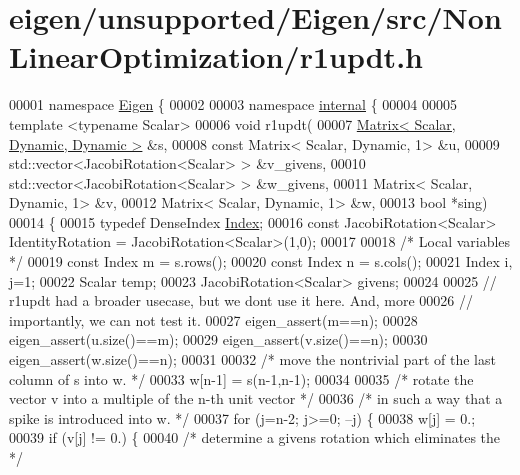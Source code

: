 \hypertarget{eigen_2unsupported_2_eigen_2src_2_non_linear_optimization_2r1updt_8h_source}{}\section{eigen/unsupported/\+Eigen/src/\+Non\+Linear\+Optimization/r1updt.h}
\label{eigen_2unsupported_2_eigen_2src_2_non_linear_optimization_2r1updt_8h_source}

\begin{DoxyCode}
00001 \textcolor{keyword}{namespace }\hyperlink{namespace_eigen}{Eigen} \{ 
00002 
00003 \textcolor{keyword}{namespace }\hyperlink{namespaceinternal}{internal} \{
00004 
00005 \textcolor{keyword}{template} <\textcolor{keyword}{typename} Scalar>
00006 \textcolor{keywordtype}{void} r1updt(
00007         \hyperlink{group___core___module}{Matrix< Scalar, Dynamic, Dynamic >} &s,
00008         \textcolor{keyword}{const} Matrix< Scalar, Dynamic, 1> &u,
00009         std::vector<JacobiRotation<Scalar> > &v\_givens,
00010         std::vector<JacobiRotation<Scalar> > &w\_givens,
00011         Matrix< Scalar, Dynamic, 1> &v,
00012         Matrix< Scalar, Dynamic, 1> &w,
00013         \textcolor{keywordtype}{bool} *sing)
00014 \{
00015     \textcolor{keyword}{typedef} DenseIndex \hyperlink{namespace_eigen_a62e77e0933482dafde8fe197d9a2cfde}{Index};
00016     \textcolor{keyword}{const} JacobiRotation<Scalar> IdentityRotation = JacobiRotation<Scalar>(1,0);
00017 
00018     \textcolor{comment}{/* Local variables */}
00019     \textcolor{keyword}{const} Index m = s.rows();
00020     \textcolor{keyword}{const} Index n = s.cols();
00021     Index i, j=1;
00022     Scalar temp;
00023     JacobiRotation<Scalar> givens;
00024 
00025     \textcolor{comment}{// r1updt had a broader usecase, but we dont use it here. And, more}
00026     \textcolor{comment}{// importantly, we can not test it.}
00027     eigen\_assert(m==n);
00028     eigen\_assert(u.size()==m);
00029     eigen\_assert(v.size()==n);
00030     eigen\_assert(w.size()==n);
00031 
00032     \textcolor{comment}{/* move the nontrivial part of the last column of s into w. */}
00033     w[n-1] = s(n-1,n-1);
00034 
00035     \textcolor{comment}{/* rotate the vector v into a multiple of the n-th unit vector */}
00036     \textcolor{comment}{/* in such a way that a spike is introduced into w. */}
00037     \textcolor{keywordflow}{for} (j=n-2; j>=0; --j) \{
00038         w[j] = 0.;
00039         \textcolor{keywordflow}{if} (v[j] != 0.) \{
00040             \textcolor{comment}{/* determine a givens rotation which eliminates the */}

\end{DoxyCode}
